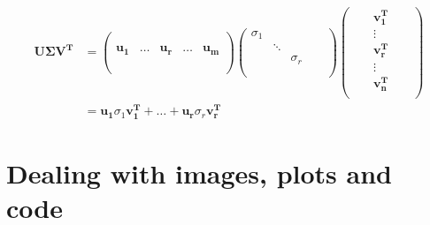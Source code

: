 \documentclass{article}
\begin{document}
\begin{align*}
\mathbf{U\Sigma V^T} &= \begin{pmatrix}
                     & & & &\\
                     & & & &\\
                     \mathbf{u_1} & \ldots & \mathbf{u_r}
                                  & \ldots & \mathbf{u_m}\\
                     & & & &\\
                     & & & &\\
                     \end{pmatrix}
                     \begin{pmatrix}
                     \sigma_1 & & & &\\
                     & \ddots & & &\\
                     & & \sigma_r & &\\
                     & & & &\\
                     \end{pmatrix}
                     \begin{pmatrix}
                     & & \mathbf{v_1^T} & & \\
                     & & \vdots & & \\
                     & & \mathbf{v_r^T} & & \\
                     & & \vdots & & \\
                     & & \mathbf{v_n^T} & & \\
                     \end{pmatrix}\\
                  &= \mathbf{u_1}\sigma_1\mathbf{v_1^T}
                   + \ldots + \mathbf{u_r}\sigma_r\mathbf{v_r^T}
\end{align*}

\section*{Dealing with images, plots and code}
\end{document}
